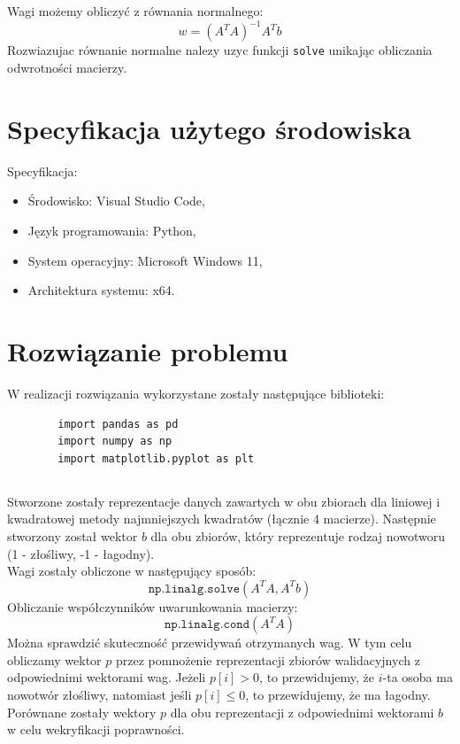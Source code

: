 \documentclass[11pt]{scrartcl}
\begin{document}
    \subsection*{}
    Wagi możemy obliczyć z równania normalnego:
    \[
        w=(A^TA)^{-1}A^Tb
    \]
    Rozwiazujac równanie normalne nalezy uzyc funkcji \texttt{solve} unikając
    obliczania odwrotności macierzy.

    \section{Specyfikacja użytego środowiska}
    Specyfikacja:

    \begin{itemize}
        \item Środowisko: Visual Studio Code,
        \item Język programowania: Python,
        \item System operacyjny: Microsoft Windows 11,
        \item Architektura systemu: x64.
    \end{itemize}

    \section{Rozwiązanie problemu}
    W realizacji rozwiązania wykorzystane zostały następujące biblioteki:

    \begin{lstlisting}
        import pandas as pd
        import numpy as np
        import matplotlib.pyplot as plt
    \end{lstlisting}

    \subsection*{}
    Stworzone zostały reprezentacje danych zawartych w obu zbiorach dla liniowej
    i kwadratowej metody najmniejszych kwadratów (łącznie 4 macierze). Następnie
    stworzony został wektor $b$ dla obu zbiorów, który reprezentuje rodzaj
    nowotworu (1 - złośliwy, -1 - łagodny). \\
    Wagi zostały obliczone w następujący sposób:
    \[
        \texttt{np.linalg.solve}(A^TA,A^Tb)
    \]
    Obliczanie współczynników uwarunkowania macierzy:
    \[
        \texttt{np.linalg.cond}(A^TA)
    \]
    Można sprawdzić skuteczność przewidywań otrzymanych wag. W tym celu
    obliczamy wektor $p$ przez pomnożenie reprezentacji zbiorów walidacyjnych
    z odpowiednimi wektorami wag. Jeżeli $p[i] > 0$, to przewidujemy, że $i$-ta
    osoba ma nowotwór złośliwy, natomiast jeśli $p[i] \leq 0$, to przewidujemy,
    że ma łagodny. Porównane zostały wektory $p$ dla obu reprezentacji
    z odpowiednimi wektorami $b$ w celu wekryfikacji poprawności.
\end{document}
